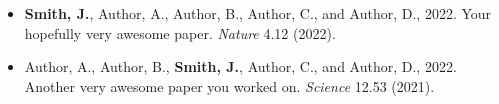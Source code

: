 \documentclass[
11pt, %
english, %
singlespacing, %
headsepline, %
]{MastersDoctoralThesis} %
\begin{document}


\appendix %



%
%


\printbibliography[heading=bibintoc]


\begin{cvpage}
\addchaptertocentry{\cv} %


\end{cvpage}


\begin{lpubli}
\addchaptertocentry{\publi}
\begin{itemize}


\item \textbf{Smith, J.}, Author, A., Author, B., Author, C., and Author, D., 2022. Your hopefully very awesome paper. \textit{Nature} 4.12 (2022).

\item Author, A., Author, B., \textbf{Smith, J.}, Author, C., and Author, D., 2022. Another very awesome paper you worked on. \textit{Science} 12.53 (2021).

\end{itemize}
\end{lpubli}
\end{document}
